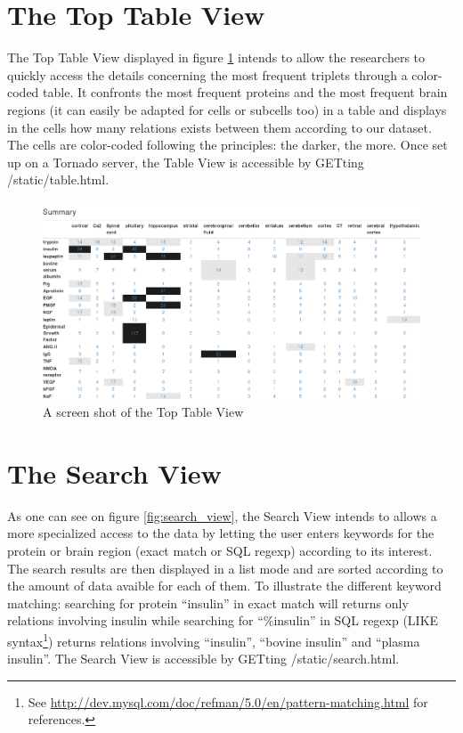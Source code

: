 \documentclass{report}
\begin{document}
			\section{The Top Table View}
			
			The Top Table View displayed in figure \ref{fig:tt_view} 
			intends to allow the researchers to quickly access the
			details concerning the most frequent triplets through a color-coded 
			table. It confronts the most frequent proteins and the most frequent
			brain regions (it can easily be adapted for cells or subcells too) in
			a table and displays in the cells how many relations exists between them according
			to our dataset. The cells are color-coded following the principles: 
			the darker, the more. Once set up on a Tornado server, the Table
			View is accessible by GETting /static/table.html.
			\begin{figure}[h]
				\includegraphics[width=\textwidth]{fig/top_table_view_screenshot.png}
				\caption{A screen shot of the Top Table View}
				\label{fig:tt_view}
			\end{figure}	
			
			\section{The Search View}
			
			As one can see on figure \ref{fig:search_view}, the Search View intends to allows
			a more specialized access to the data by letting the user enters keywords for the protein
			or brain region (exact match or SQL regexp) according to its interest. The search results 
			are then displayed in a list mode and are sorted according to the amount of data avaible
			for each of them. To illustrate the different keyword matching: 
			searching for protein ``insulin'' in exact match will returns
			only relations involving insulin while searching for ``\%insulin''
			in SQL regexp (LIKE syntax\footnote{See \url{http://dev.mysql.com/doc/refman/5.0/en/pattern-matching.html} for references.}) returns relations involving ``insulin'',
			``bovine insulin'' and ``plasma insulin''. The Search View is
			accessible by GETting /static/search.html.
			
\end{document}

